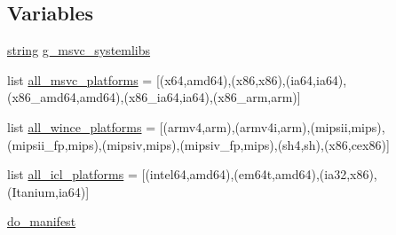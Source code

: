 \subsection*{Variables}
\begin{DoxyCompactItemize}
\item 
\hyperlink{test__lib_f_l_a_c_2format_8c_ab02026ad0de9fb6c1b4233deb0a00c75}{string} \hyperlink{namespacewaflib_1_1_tools_1_1msvc_a5701e2c6c010e48d48c77dd65f11528d}{g\+\_\+msvc\+\_\+systemlibs}
\item 
list \hyperlink{namespacewaflib_1_1_tools_1_1msvc_a89d948f635b53cc5f70812e75d91c465}{all\+\_\+msvc\+\_\+platforms} = \mbox{[}(\textquotesingle{}x64\textquotesingle{},\textquotesingle{}amd64\textquotesingle{}),(\textquotesingle{}x86\textquotesingle{},\textquotesingle{}x86\textquotesingle{}),(\textquotesingle{}ia64\textquotesingle{},\textquotesingle{}ia64\textquotesingle{}),(\textquotesingle{}x86\+\_\+amd64\textquotesingle{},\textquotesingle{}amd64\textquotesingle{}),(\textquotesingle{}x86\+\_\+ia64\textquotesingle{},\textquotesingle{}ia64\textquotesingle{}),(\textquotesingle{}x86\+\_\+arm\textquotesingle{},\textquotesingle{}arm\textquotesingle{})\mbox{]}
\item 
list \hyperlink{namespacewaflib_1_1_tools_1_1msvc_adbd268e79bee1dfb9e8410f4747ffbf7}{all\+\_\+wince\+\_\+platforms} = \mbox{[}(\textquotesingle{}armv4\textquotesingle{},\textquotesingle{}arm\textquotesingle{}),(\textquotesingle{}armv4i\textquotesingle{},\textquotesingle{}arm\textquotesingle{}),(\textquotesingle{}mipsii\textquotesingle{},\textquotesingle{}mips\textquotesingle{}),(\textquotesingle{}mipsii\+\_\+fp\textquotesingle{},\textquotesingle{}mips\textquotesingle{}),(\textquotesingle{}mipsiv\textquotesingle{},\textquotesingle{}mips\textquotesingle{}),(\textquotesingle{}mipsiv\+\_\+fp\textquotesingle{},\textquotesingle{}mips\textquotesingle{}),(\textquotesingle{}sh4\textquotesingle{},\textquotesingle{}sh\textquotesingle{}),(\textquotesingle{}x86\textquotesingle{},\textquotesingle{}cex86\textquotesingle{})\mbox{]}
\item 
list \hyperlink{namespacewaflib_1_1_tools_1_1msvc_abbff92131441f974d750d37830ab3087}{all\+\_\+icl\+\_\+platforms} = \mbox{[}(\textquotesingle{}intel64\textquotesingle{},\textquotesingle{}amd64\textquotesingle{}),(\textquotesingle{}em64t\textquotesingle{},\textquotesingle{}amd64\textquotesingle{}),(\textquotesingle{}ia32\textquotesingle{},\textquotesingle{}x86\textquotesingle{}),(\textquotesingle{}Itanium\textquotesingle{},\textquotesingle{}ia64\textquotesingle{})\mbox{]}
\item 
\hyperlink{namespacewaflib_1_1_tools_1_1msvc_aada44e31b693de956a5799c8671e9178}{do\+\_\+manifest}
\end{DoxyCompactItemize}


